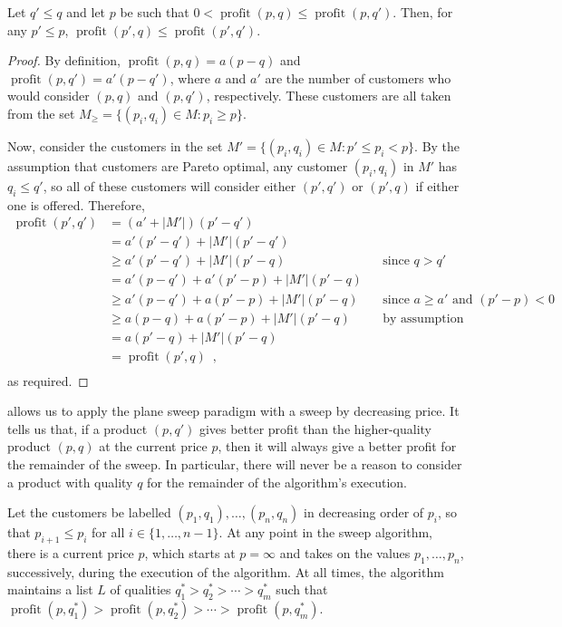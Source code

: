 \documentclass[lotsofwhite]{patmorin}
\newcommand{\val}{\operatorname{profit}}
\begin{document}
\begin{lem}
  Let $q' \le q$ and let $p$ be such that $0 < \val(p,q) \le \val(p,q')$.
  Then, for any $p' \le p$, $\val(p',q) \le \val(p',q')$.
\end{lem}

\begin{proof}
  By definition, $\val(p,q) = a(p-q)$ and $\val(p,q') = a'(p-q')$, where
  $a$ and $a'$ are the number of customers who would consider $(p,q)$
  and $(p,q')$, respectively.  These customers are all taken from the
  set $M_\ge =\{(p_i,q_i)\in M: p_i \ge p\}$.

  Now, consider the customers in the set $M'=\{(p_i,q_i)\in M: p' \le
  p_i < p\}$.  By the assumption that customers are Pareto optimal,
  any customer $(p_i,q_i)$ in $M'$ has $q_i \le q'$, so all of these
  customers will consider either $(p',q')$ or $(p',q)$ if either one
  is offered.  Therefore,
  \[
    \begin{aligned}
      \val(p',q')
        &  =   (a'+|M'|)(p'-q') \\
        &  =   a'(p'-q') + |M'|(p'-q') \\
        & \ge  a'(p'-q') + |M'|(p'-q) 
               && \mbox{since $q > q'$} \\
        &  =   a'(p-q') + a'(p'-p) + |M'|(p'-q) \\
        & \ge  a'(p-q') + a(p'-p) + |M'|(p'-q) 
               && \mbox{since $a \ge a'$ and $(p'-p) < 0$} \\
        & \ge  a(p-q) + a(p'-p) + |M'|(p'-q) 
               && \mbox{by assumption} \\
        &  =  a(p'-q) + |M'|(p'-q) \\
        &  =  \val(p',q) \enspace , \\
    \end{aligned}
  \]
  as required.
\end{proof}

 allows us to apply the plane sweep paradigm with a sweep
by decreasing price.  It tells us that, if a product $(p,q')$ gives better
profit than the higher-quality product $(p,q)$ at the current price $p$,
then it will always give a better profit for the remainder of the sweep.
In particular, there will never be a reason to consider a product with
quality $q$ for the remainder of the algorithm's execution.

Let the customers be labelled $(p_1,q_1),\ldots,(p_n,q_n)$ in decreasing
order of $p_i$, so that $p_{i+1} \le p_i$ for all $i\in\{1,\ldots,n-1\}$.
At any point in the sweep algorithm, there is a current price $p$,
which starts at $p=\infty$ and takes on the values $p_1,\ldots,p_n$,
successively, during the execution of the algorithm.  At all times, the
algorithm maintains a list $L$ of qualities $q_1^* > q_2^* > \cdots >
q_m^*$ such that $\val(p,q_1^*) > \val(p,q_2^*) >\cdots>\val(p,q_m^*)$.
\end{document}
